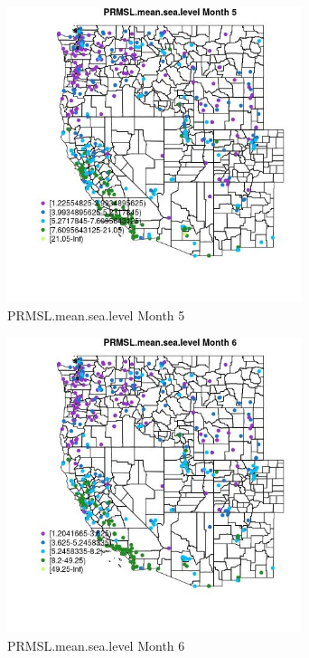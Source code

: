 \begin{figure} 
\centering  
\includegraphics[width=0.77\textwidth]{Code_Outputs/ML_input_report_ML_input_PM25_Step5_part_d_de_duplicated_aves_ML_input_MapObsMo5PRMSLmeansealevel.jpg} 
\caption{\label{fig:ML_input_report_ML_input_PM25_Step5_part_d_de_duplicated_aves_ML_inputMapObsMo5PRMSLmeansealevel}PRMSL.mean.sea.level Month 5} 
\end{figure} 
 

\begin{figure} 
\centering  
\includegraphics[width=0.77\textwidth]{Code_Outputs/ML_input_report_ML_input_PM25_Step5_part_d_de_duplicated_aves_ML_input_MapObsMo6PRMSLmeansealevel.jpg} 
\caption{\label{fig:ML_input_report_ML_input_PM25_Step5_part_d_de_duplicated_aves_ML_inputMapObsMo6PRMSLmeansealevel}PRMSL.mean.sea.level Month 6} 
\end{figure} 
 

